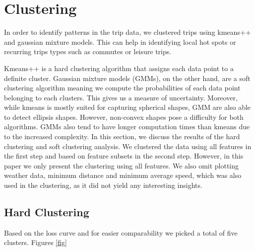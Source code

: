 \section{Clustering}
\label{sec:clustering}

In order to identify patterns in the trip data, we clustered trips using kmeans++ and gaussian mixture models. This can help in identifying local hot spots or recurring trips types such as commutes or leisure trips.

Kmeans++ is a hard clustering algorithm that assigns each data point to a definite cluster. Gaussian mixture models (GMMs), on the other  hand, are a soft clustering algorithm meaning we compute the probabilities of each data point belonging to each clusters. This gives us a measure of uncertainty. Moreover, while kmeans is mostly suited for capturing spherical shapes, GMM are also able to detect ellipsis shapes. However, non-convex shapes pose a difficulty for both algorithms. GMMs also tend to have longer computation times than kmeans due to the increased complexity.
In this section, we discuss the results of the hard clustering and soft clustering analysis. We clustered the data using all features in the first step and based on feature subsets in the second step. However, in this paper we only present the clustering using all features. We also omit plotting weather data, minimum distance and minimum average speed, which was also used in the clustering, as it did not yield any interesting insights.

\subsection{Hard Clustering}
\label{sec:hard_clustering}

Based on the loss curve and for easier comparability we picked a total of five clusters. Figures \ref{fig}


